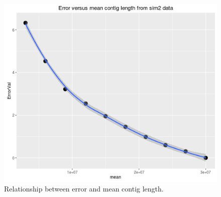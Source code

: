 \documentclass[11pt,a4paper]{article}
\begin{document}
\begin{figure}[h]
  \center
  \includegraphics[width=.7\linewidth]{figures/sim2ErrorVsMeanContigLength.png}
  \caption{Relationship between error and mean contig length.}\label{sim2ErrorVsMeanContigLength}
\end{figure}
\end{document}
